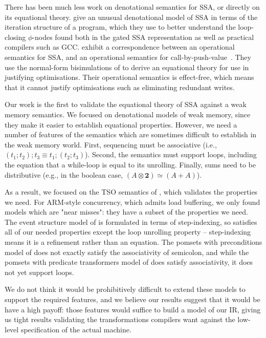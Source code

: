 \documentclass[acmsmall,screen,review]{acmart}
\newcommand{\mb}[1]{\ensuremath{\mathbf{#1}}}
\begin{document}
There has been much less work on denotational semantics for SSA, or directly on
its equational theory. \citet{pop-ssa-inout-2009} give an unusual denotational
model of SSA in terms of the iteration structure of a program, which they use to
better understand the loop-closing $\phi$-nodes found both in the gated SSA
representation as well as practical compilers such as GCC.
\citet{garbuzov-structural-cfg-2018} exhibit a correspondence between an
operational semantics for SSA, and an operational semantics for
call-by-push-value~\cite{cbpv}. They use the normal-form bisimulations of
\citet{lassen-bisim} to derive an equational theory for use in justifying
optimisations. Their operational semantics is effect-free, which means that it
cannot justify optimisations such as eliminating redundant writes.

Our work is the first to validate the equational theory of SSA against a weak
memory semantics. We focused on denotational models of weak memory, since they
make it easier to establish equational properties. However, we need a number of
features of the semantics which are sometimes difficult to establish in the weak
memory world. First, sequencing must be associative (i.e., $(t_1; t_2); t_3
\equiv t_1; (t_2; t_3)$).  Second, the semantics must support loops, including
the equation that a while-loop is equal to its unrolling. Finally, sums need to
be distributive (e.g., in the boolean case, $(A \otimes \mb{2}) \simeq (A +
A)$).

As a result, we focused on the TSO semantics of \citet{sparky}, which validates
the properties we need. For ARM-style concurrency, which admits load buffering,
we only found models which are "near misses": they have a subset of the
properties we need. The event structure model of
\citet{paviotti-modular-relaxed-dep-20} is formulated in terms of step-indexing,
so satisfies all of our needed properties except the loop unrolling property --
step-indexing means it is a refinement rather than an equation. The pomsets with
preconditions model of \citet{jagadeesan-pwp-20} does not exactly satisfy the
associativity of semicolon, and while the pomsets with predicate transformers
model of \citet{leaky-semicolon} does satisfy associativity, it does not yet
support loops.

We do not think it would be prohibitively difficult to extend these models to
support the required features, and we believe our results suggest that it would
be have a high payoff: those features would suffice to build a model of our IR,
giving us tight results validating the transformations compilers want against
the low-level specification of the actual machine. 
\end{document}
